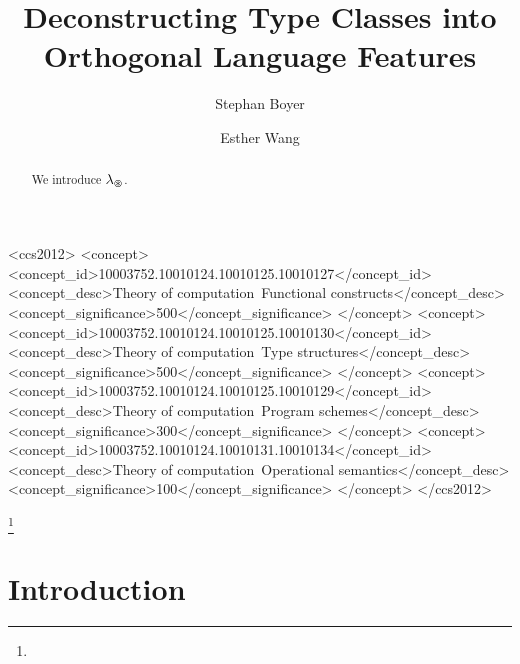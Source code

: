 \documentclass[acmlarge]{acmart}
\newcommand\lambdaimplicit{\lambda_{\varoast}}
\begin{document}
\title{Deconstructing Type Classes into Orthogonal Language Features}
\author{Stephan Boyer}
\author{Esther Wang}


\begin{abstract}
  We introduce $\lambdaimplicit$.
\end{abstract}


%
\begin{CCSXML}
<ccs2012>
<concept>
<concept_id>10003752.10010124.10010125.10010127</concept_id>
<concept_desc>Theory of computation~Functional constructs</concept_desc>
<concept_significance>500</concept_significance>
</concept>
<concept>
<concept_id>10003752.10010124.10010125.10010130</concept_id>
<concept_desc>Theory of computation~Type structures</concept_desc>
<concept_significance>500</concept_significance>
</concept>
<concept>
<concept_id>10003752.10010124.10010125.10010129</concept_id>
<concept_desc>Theory of computation~Program schemes</concept_desc>
<concept_significance>300</concept_significance>
</concept>
<concept>
<concept_id>10003752.10010124.10010131.10010134</concept_id>
<concept_desc>Theory of computation~Operational semantics</concept_desc>
<concept_significance>100</concept_significance>
</concept>
</ccs2012>
\end{CCSXML}


%
%

\terms{}



\thanks{
}


\maketitle

\section{Introduction}
\end{document}
